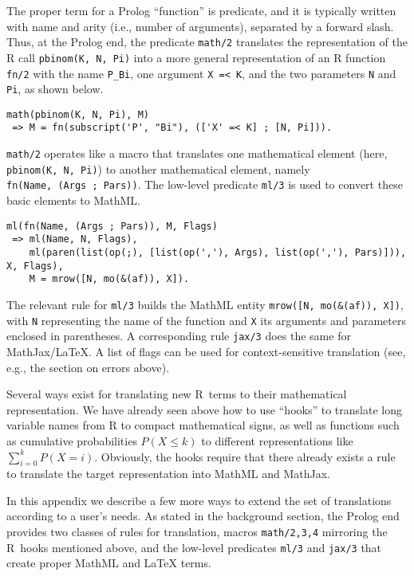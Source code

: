The proper term for a Prolog ``function'' is predicate, and it is typically
written with name and arity (i.e., number of arguments), separated by a forward
slash. Thus, at the Prolog end, the predicate \texttt{math/2} translates the
representation of the R call \texttt{pbinom(K,\ N,\ Pi)} into a more general
representation of an R function \texttt{fn/2} with the name \texttt{P\_Bi}, one
argument \texttt{X\ =\textless{}\ K}, and the two parameters \texttt{N} and \texttt{Pi}, as shown below.

\begin{verbatim}
math(pbinom(K, N, Pi), M)
 => M = fn(subscript('P', "Bi"), (['X' =< K] ; [N, Pi])).
\end{verbatim}

\texttt{math/2} operates like a macro that translates one mathematical
element (here, \texttt{pbinom(K,\ N,\ Pi)}) to another mathematical element,
namely \texttt{fn(Name,\ (Args\ ;\ Pars))}. The low-level predicate \texttt{ml/3} is used to
convert these basic elements to MathML.

\begin{verbatim}
ml(fn(Name, (Args ; Pars)), M, Flags)
 => ml(Name, N, Flags),
    ml(paren(list(op(;), [list(op(','), Args), list(op(','), Pars)])), X, Flags),
    M = mrow([N, mo(&(af)), X]).
\end{verbatim}

The relevant rule for \texttt{ml/3} builds the MathML entity \texttt{mrow({[}N,\ mo(\&(af)),\ X{]})},
with \texttt{N} representing the name of the function and \texttt{X} its arguments and
parameters enclosed in parentheses. A corresponding rule \texttt{jax/3} does the same
for MathJax/LaTeX. A list of flags can be used for context-sensitive
translation (see, e.g., the section on errors above).

Several ways exist for translating new R~terms to their mathematical
representation. We have already seen above how to use ``hooks'' to translate long
variable names from R to compact mathematical signs, as well as functions such
as cumulative probabilities \(P(X \le k)\) to different representations
like \(\sum_{i=0}^k P(X = i)\). Obviously, the hooks require that there already
exists a rule to translate the target representation into MathML and MathJax.

In this appendix we describe a few more ways to extend the set of translations
according to a user's needs. As stated in the background section, the Prolog end
provides two classes of rules for translation, macros \texttt{math/2,3,4} mirroring the
R~hooks mentioned above, and the low-level predicates \texttt{ml/3} and \texttt{jax/3} that
create proper MathML and LaTeX terms.

